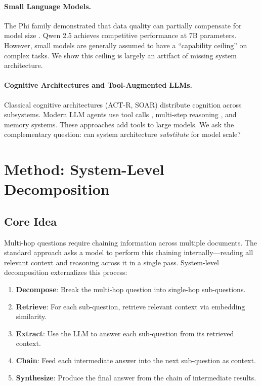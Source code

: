 \documentclass[11pt]{article}
\begin{document}
\paragraph{Small Language Models.}
The Phi family demonstrated that data quality can partially compensate for model size \citep{gunasekar2023textbooks}. Qwen 2.5 \citep{qwen2025qwen25} achieves competitive performance at 7B parameters. However, small models are generally assumed to have a ``capability ceiling'' on complex tasks. We show this ceiling is largely an artifact of missing system architecture.

\paragraph{Cognitive Architectures and Tool-Augmented LLMs.}
Classical cognitive architectures (ACT-R, SOAR) distribute cognition across subsystems. Modern LLM agents use tool calls \citep{schick2023toolformer}, multi-step reasoning \citep{yao2023react}, and memory systems. These approaches add tools to large models. We ask the complementary question: can system architecture \emph{substitute} for model scale?

\section{Method: System-Level Decomposition}
\label{sec:method}

\subsection{Core Idea}

Multi-hop questions require chaining information across multiple documents. The standard approach asks a model to perform this chaining internally---reading all relevant context and reasoning across it in a single pass. System-level decomposition externalizes this process:

\begin{enumerate}[nosep]
    \item \textbf{Decompose}: Break the multi-hop question into single-hop sub-questions.
    \item \textbf{Retrieve}: For each sub-question, retrieve relevant context via embedding similarity.
    \item \textbf{Extract}: Use the LLM to answer each sub-question from its retrieved context.
    \item \textbf{Chain}: Feed each intermediate answer into the next sub-question as context.
    \item \textbf{Synthesize}: Produce the final answer from the chain of intermediate results.
\end{enumerate}
\end{document}

